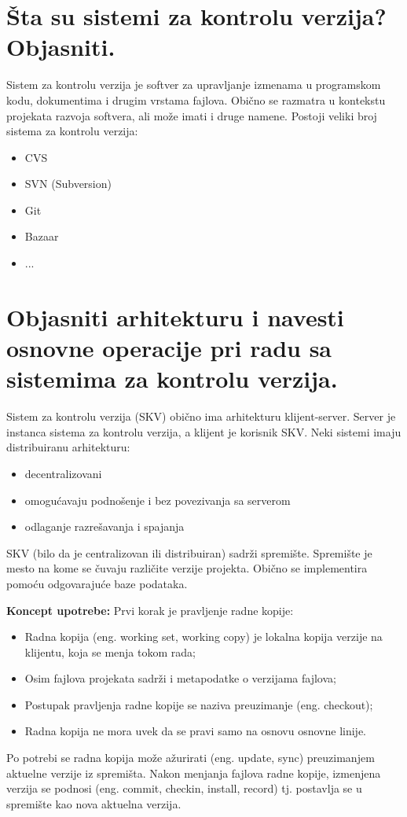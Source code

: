 \documentclass[a4paper]{article}
\begin{document}
  
\section{Šta su sistemi za kontrolu verzija? Objasniti.}
  Sistem za kontrolu verzija je softver za upravljanje izmenama u programskom kodu, 
  dokumentima i drugim vrstama fajlova. Obično se razmatra u kontekstu projekata razvoja 
  softvera, ali može imati i druge namene. Postoji veliki broj sistema za kontrolu verzija:
  \begin{itemize}
    \item CVS
    \item SVN (Subversion)
    \item Git
    \item Bazaar
    \item ...
  \end{itemize}
\section{Objasniti arhitekturu i navesti osnovne operacije pri radu sa sistemima za kontrolu verzija.}
  Sistem za kontrolu verzija (SKV) obično ima arhitekturu klijent-server. 
  Server je instanca sistema za kontrolu verzija, a klijent je korisnik SKV.
  Neki sistemi imaju distribuiranu arhitekturu:
  \begin{itemize}
    \item decentralizovani
    \item omogućavaju podnošenje i bez povezivanja sa serverom
    \item odlaganje razrešavanja i spajanja
  \end{itemize}
  SKV (bilo da je centralizovan ili distribuiran) sadrži spremište. 
  Spremište je mesto na kome se čuvaju različite verzije projekta. 
  Obično se implementira pomoću odgovarajuće baze podataka.
  
  \textbf{Koncept upotrebe:} Prvi korak je pravljenje radne kopije:
  \begin{itemize}
    \item Radna kopija (eng. working set, working copy) je lokalna kopija verzije na klijentu, 
          koja se menja tokom rada;
    \item Osim fajlova projekata sadrži i metapodatke o verzijama fajlova;
    \item Postupak pravljenja radne kopije se naziva preuzimanje (eng. checkout);
    \item Radna kopija ne mora uvek da se pravi samo na osnovu osnovne linije.
  \end{itemize}
  Po potrebi se radna kopija može ažurirati (eng. update, sync) preuzimanjem aktuelne verzije 
  iz spremišta. Nakon menjanja fajlova radne kopije, izmenjena verzija se podnosi 
  (eng. commit, checkin, install, record) tj. postavlja se u spremište kao nova aktuelna verzija.\\
  
\end{document}
